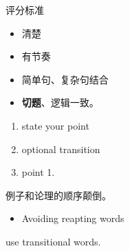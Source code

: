\documentclass[ignorenonframetext,]{beamer}
\providecommand{\tightlist}{%
  \setlength{\itemsep}{0pt}\setlength{\parskip}{0pt}}
\begin{document}
\begin{frame}{评分标准}
\protect\hypertarget{ux8bc4ux5206ux6807ux51c6}{}

\begin{itemize}
\item
  清楚
\item
  有节奏
\item
  简单句、复杂句结合
\item
  \textbf{切题}、逻辑一致。
\end{itemize}

\end{frame}

\begin{frame}

\begin{enumerate}
\item
  state your point
\item
  optional transition
\item
  point 1.
\end{enumerate}

例子和论理的顺序颠倒。

\begin{itemize}
\tightlist
\item
  Avoiding reapting words
\end{itemize}

use transitional words.

\end{frame}
\end{document}
